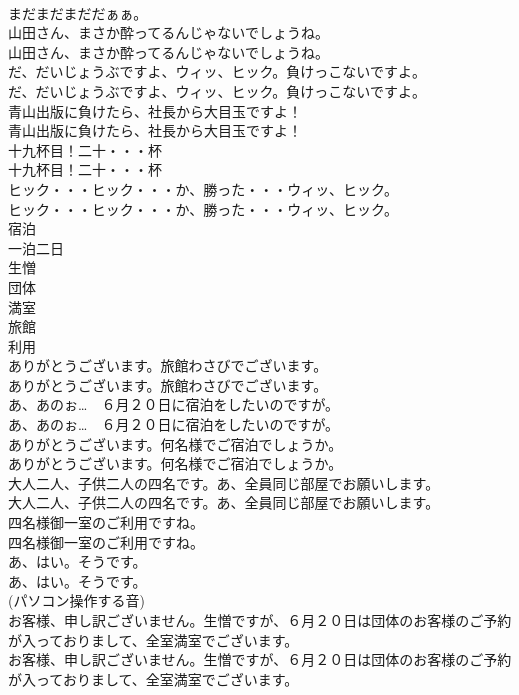 \documentclass[8pt]{extreport}
\begin{document}
\begin{CJK}{UTF8}{min}
\\	まだまだまだだぁぁ。 
\\	山田さん、まさか酔ってるんじゃないでしょうね。	
\\	山田さん、まさか酔ってるんじゃないでしょうね。 
\\	だ、だいじょうぶですよ、ウィッ、ヒック。負けっこないですよ。	
\\	だ、だいじょうぶですよ、ウィッ、ヒック。負けっこないですよ。 
\\	青山出版に負けたら、社長から大目玉ですよ！	
\\	青山出版に負けたら、社長から大目玉ですよ！ 
\\	十九杯目！二十・・・杯	
\\	十九杯目！二十・・・杯 
\\	ヒック・・・ヒック・・・か、勝った・・・ウィッ、ヒック。	
\\	ヒック・・・ヒック・・・か、勝った・・・ウィッ、ヒック。 
\\	宿泊
\\	一泊二日
\\	生憎
\\	団体
\\	満室
\\	旅館
\\	利用
\\	ありがとうございます。旅館わさびでございます。	
\\	ありがとうございます。旅館わさびでございます。 
\\	あ、あのぉ…　６月２０日に宿泊をしたいのですが。	
\\	あ、あのぉ…　６月２０日に宿泊をしたいのですが。 
\\	ありがとうございます。何名様でご宿泊でしょうか。	
\\	ありがとうございます。何名様でご宿泊でしょうか。 
\\	大人二人、子供二人の四名です。あ、全員同じ部屋でお願いします。	
\\	大人二人、子供二人の四名です。あ、全員同じ部屋でお願いします。 
\\	四名様御一室のご利用ですね。	
\\	四名様御一室のご利用ですね。 
\\	あ、はい。そうです。	
\\	あ、はい。そうです。 
\\	(パソコン操作する音)	
\\	お客様、申し訳ございません。生憎ですが、６月２０日は団体のお客様のご予約が入っておりまして、全室満室でございます。	
\\	お客様、申し訳ございません。生憎ですが、６月２０日は団体のお客様のご予約が入っておりまして、全室満室でございます。 

\end{CJK}
\end{document}
